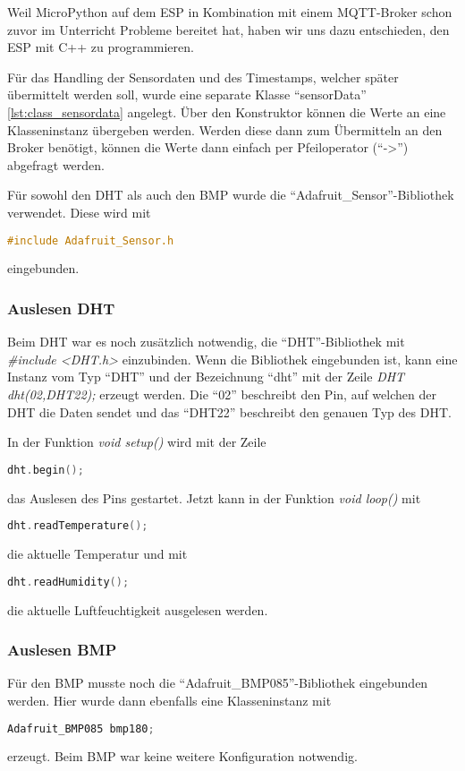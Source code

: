 Weil MicroPython auf dem ESP in Kombination mit einem MQTT-Broker schon 
zuvor im Unterricht Probleme bereitet hat, haben wir uns dazu entschieden, den ESP mit C++ zu programmieren.

Für das Handling der Sensordaten und des Timestamps, welcher später übermittelt werden soll, wurde eine separate Klasse "`sensorData"' \ref{lst:class_sensordata} angelegt.
Über den Konstruktor können die Werte an eine Klasseninstanz übergeben werden. 
Werden diese dann zum Übermitteln an den Broker benötigt, können die Werte dann einfach per Pfeiloperator ("`->"') abgefragt werden.

Für sowohl den DHT als auch den BMP wurde die "`Adafruit\_Sensor"'-Bibliothek verwendet.
Diese wird mit 
\begin{lstlisting}[language=C++]
	#include Adafruit_Sensor.h
\end{lstlisting}
eingebunden.

\subsubsection{Auslesen DHT}
	Beim DHT war es noch zusätzlich notwendig, die "`DHT"'-Bibliothek mit \textit{\#include <DHT.h>} einzubinden.
	Wenn die Bibliothek eingebunden ist, kann eine Instanz vom Typ "`DHT"' und der Bezeichnung "`dht"' mit der Zeile \textit{DHT dht(02,DHT22);} erzeugt werden.
	Die "`02"' beschreibt den Pin, auf welchen der DHT die Daten sendet und das "`DHT22"' beschreibt den genauen Typ des DHT.
	
	In der Funktion \textit{void setup()} wird mit der Zeile
\begin{lstlisting}[language=C++]
	dht.begin();
\end{lstlisting}
	das Auslesen des Pins gestartet. 
	Jetzt kann in der Funktion \textit{void loop()} mit 
\begin{lstlisting}[language=C++]
	dht.readTemperature();
\end{lstlisting}
	die aktuelle Temperatur und mit
\begin{lstlisting}[language=C++]
	dht.readHumidity();
\end{lstlisting}
	die aktuelle Luftfeuchtigkeit ausgelesen werden.
	
\subsubsection{Auslesen BMP}
	Für den BMP musste noch die "`Adafruit\_BMP085"'-Bibliothek eingebunden werden.
	Hier wurde dann ebenfalls eine Klasseninstanz mit 
\begin{lstlisting}[language=C++]
	Adafruit_BMP085 bmp180;
\end{lstlisting}
	erzeugt. Beim BMP war keine weitere Konfiguration notwendig.
	
